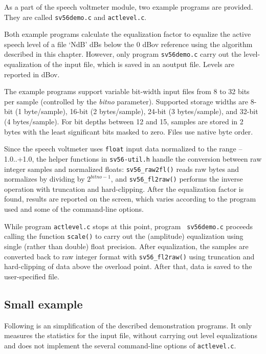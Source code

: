 As a part of the speech voltmeter module, two example programs
are provided. They are called {\tt sv56demo.c} and {\tt actlevel.c}.

Both example programs calculate the equalization factor to equalize
the active speech level of a file `NdB' dBs below the 0 dBov
reference using the algorithm described in this chapter. However,
only program {\tt sv56demo.c} carry out the level-equalization of the
input file, which is saved in an aoutput file. Levels are reported in
dBov.

The example programs support variable bit-width input files from 8 to
32 bits per sample (controlled by the {\em bitno} parameter). Supported
storage widths are 8-bit (1 byte/sample), 16-bit (2 bytes/sample),
24-bit (3 bytes/sample), and 32-bit (4 bytes/sample). For bit depths
between 12 and 15, samples are stored in 2 bytes with the least
significant bits masked to zero. Files use native byte order.

Since the speech voltmeter uses {\tt float} input data normalized to
the range --1.0..+1.0, the helper functions in {\tt sv56-util.h} handle
the conversion between raw integer samples and normalized floats:
{\tt sv56\_raw2fl()} reads raw bytes and normalizes by dividing by
$2^{bitno-1}$, and {\tt sv56\_fl2raw()} performs the inverse operation
with truncation and hard-clipping.
After the equalization factor is found, results are reported on the
screen, which varies according to the program used and some of the
command-line options.

While program {\tt actlevel.c} stops at this point, program {\tt
sv56demo.c} proceeds calling the function {\tt scale()} to carry out
the (amplitude) equalization using single (rather than double) float
precision. After equalization, the samples are converted back to
raw integer format with {\tt sv56\_fl2raw()} using
truncation and hard-clipping of data above the
overload point. After that, data is saved to the user-specified file.


\subsection {Small example}

Following is an simplification of the described demonstration programs. It
only measures the statistics for the input file, without carrying out
level equalizations and does not implement the several command-line
options of  {\tt actlevel.c}.

